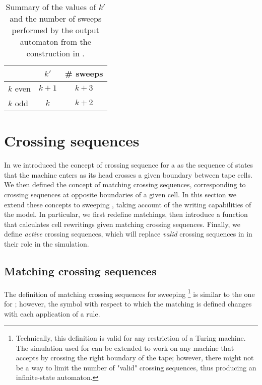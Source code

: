 \begin{table}
	\centering
	\begin{tabular}{lcc}
		\toprule
		~        & $k'$  & \# sweeps \\
		\midrule
		$k$ even & $k+1$ & $k+3$     \\
		$k$ odd  & $k$   & $k+2$     \\
		\bottomrule
	\end{tabular}
	\caption{Summary of the values of $k'$ and the number of sweeps performed by the output automaton from the construction in .}
	\label{tab:kprimesweep}
\end{table}



\section{Crossing sequences}\label{sec:crossseqswdla}
In  we introduced the concept of crossing sequence for a \TDFA as the sequence of states that the machine enters as its head crosses a given boundary between tape cells.
We then defined the concept of matching crossing sequences, corresponding to crossing sequences at opposite boundaries of a given cell.
In this section we extend these concepts to sweeping \kDLAs, taking account of the writing capabilities of the model.
In particular, we first redefine matchings, then introduce a function that calculates cell rewritings given matching crossing sequences.
Finally, we define \emph{active} crossing sequences, which will replace \emph{valid} crossing sequences in \TDFAs in their role in the simulation.


\subsection{Matching crossing sequences}
The definition of matching crossing sequences for sweeping \kDLAs\footnote{%
	Technically, this definition is valid for any restriction of a Turing machine. The simulation used for \TDFAs can be extended to work on any machine that accepts by crossing the right boundary of the tape; however, there might not be a way to limit the number of "valid" crossing sequences, thus producing an infinite-state automaton.}
is similar to the one for \TDFAs; however, the symbol with respect to which the matching is defined changes with each application of a rule.

